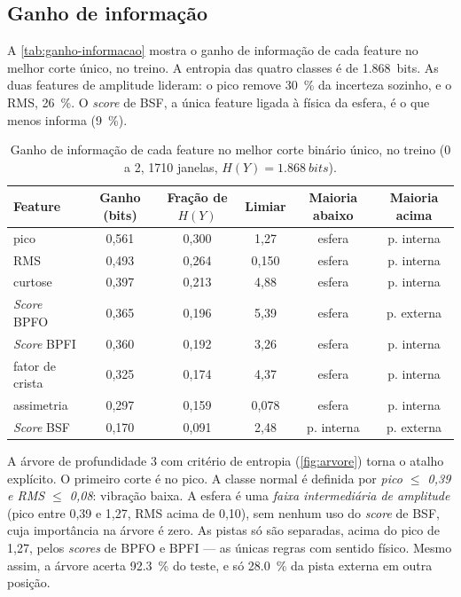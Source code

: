\subsection{Ganho de informação}
\label{sec:res-ganho}

A
\autoref{tab:ganho-informacao} mostra o ganho de informação de cada feature no
melhor corte único, no treino. A entropia das quatro classes é de
\SI{1.868}{bits}. As duas features de amplitude lideram: o pico remove
\SI{30}{\percent} da incerteza sozinho, e o RMS, \SI{26}{\percent}. O \emph{score} de
BSF, a única feature ligada à física da esfera, é o que menos informa
(\SI{9}{\percent}).

\begin{table}[htb]
  \centering
  \caption{Ganho de informação de cada feature no melhor corte binário único,
  no treino (0 a \SI{2}{\hp}, 1710 janelas, $H(Y) = \SI{1.868}{bits}$).}
  \label{tab:ganho-informacao}
  \footnotesize
  \begin{tabular}{lccccc}
    \toprule
    \textbf{Feature} & \textbf{Ganho (bits)} & \textbf{Fração de $H(Y)$} &
    \textbf{Limiar} & \textbf{Maioria abaixo} & \textbf{Maioria acima} \\
    \midrule
    pico          & 0,561 & 0,300 & 1,27  & esfera & p. interna \\
    RMS           & 0,493 & 0,264 & 0,150 & esfera & p. interna \\
    curtose       & 0,397 & 0,213 & 4,88  & esfera & p. interna \\
    \emph{Score} BPFO   & 0,365 & 0,196 & 5,39  & esfera & p. externa \\
    \emph{Score} BPFI   & 0,360 & 0,192 & 3,26  & esfera & p. interna \\
    fator de crista & 0,325 & 0,174 & 4,37 & esfera & p. interna \\
    assimetria    & 0,297 & 0,159 & 0,078 & esfera & p. interna \\
    \emph{Score} BSF    & 0,170 & 0,091 & 2,48  & p. interna & p. externa \\
    \bottomrule
  \end{tabular}
\end{table}

A árvore de profundidade 3 com critério de entropia
(\autoref{fig:arvore}) torna o atalho explícito. O primeiro corte é no pico. A
classe normal é definida por \emph{pico $\le$ 0,39 e RMS $\le$ 0,08}: vibração
baixa. A esfera é uma \emph{faixa intermediária de amplitude} (pico entre 0,39 e
1,27, RMS acima de 0,10), sem nenhum uso do \emph{score} de BSF, cuja importância na
árvore é zero. As pistas só são separadas, acima do pico de 1,27, pelos \emph{scores}
de BPFO e BPFI --- as únicas regras com sentido físico. Mesmo assim, a árvore
acerta \SI{92.3}{\percent} do teste, e só \SI{28.0}{\percent} da pista externa em
outra posição.

